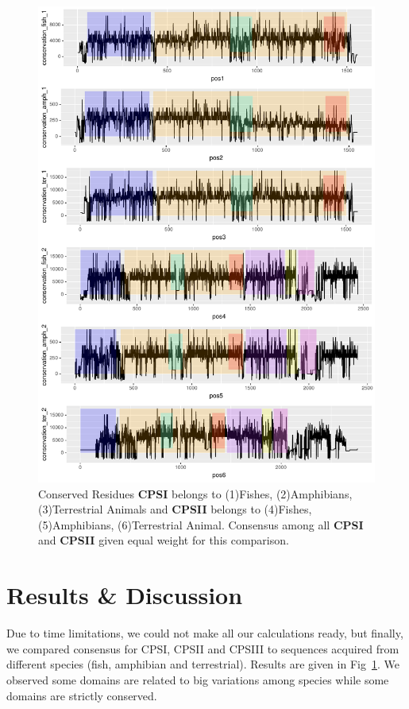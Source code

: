 \documentclass[a4paper]{article}
\begin{document}
\newpage
\begin{figure}[H]
\begin{center}
\includegraphics[width=\textwidth]{vsconsensus.pdf}
\end{center}
\caption{Conserved Residues \textbf{CPSI} belongs to (1)Fishes, (2)Amphibians, (3)Terrestrial Animals and \textbf{CPSII} belongs to (4)Fishes, (5)Amphibians, (6)Terrestrial Animal. Consensus among all \textbf{CPSI} and \textbf{CPSII} given equal weight for this comparison.}
\label{fig:biggraph2}
\end{figure}

\section{Results & Discussion}
Due to time limitations, we could not make all our calculations ready, but finally, we compared consensus for CPSI, CPSII and CPSIII to sequences acquired from different species (fish, amphibian and terrestrial). Results are given in Fig~\ref{fig:biggraph2}. We observed some domains are related to big variations among species while some domains are strictly conserved.


{}

\end{document}
